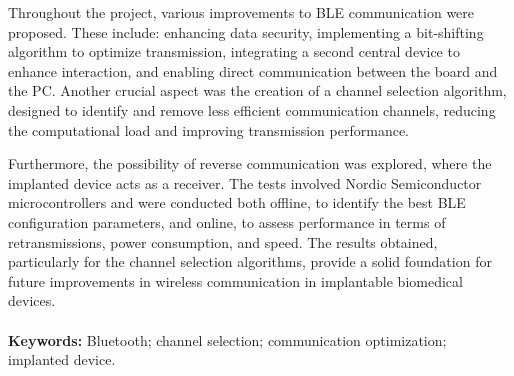 \documentclass{Configuration_Files/PoliMi3i_thesis}
\begin{document}
Throughout the project, various improvements to BLE communication were proposed. These include: enhancing data security, implementing a bit-shifting algorithm to optimize transmission, integrating a second central device to enhance interaction, and enabling direct communication between the board and the PC. Another crucial aspect was the creation of a channel selection algorithm, designed to identify and remove less efficient communication channels, reducing the computational load and improving transmission performance.

Furthermore, the possibility of reverse communication was explored, where the implanted device acts as a receiver. The tests involved Nordic Semiconductor microcontrollers and were conducted both offline, to identify the best BLE configuration parameters, and online, to assess performance in terms of retransmissions, power consumption, and speed. The results obtained, particularly for the channel selection algorithms, provide a solid foundation for future improvements in wireless communication in implantable biomedical devices.
\\
\\
\textbf{Keywords:} Bluetooth; channel selection; communication optimization; implanted device.

\end{document}
